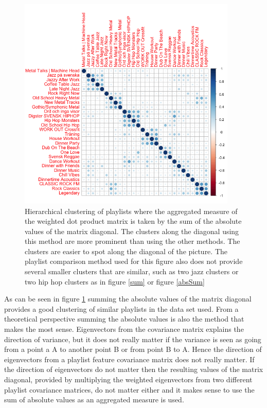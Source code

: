 \documentclass[a4paper,11pt]{kth-mag}
\begin{document}
\begin{figure}
\centering
\includegraphics[width=0.93\textwidth]{images/sumAbs.png}
\caption{Hierarchical clustering of playlists where the aggregated measure of the weighted dot product matrix is taken by the sum of the absolute values of the matrix diagonal. The clusters along the diagonal using this method are more prominent than using the other methods. The clusters are easier to spot along the diagonal of the picture. The playlist comparison method used for this figure also does not provide several smaller clusters that are similar, such as two jazz clusters or two hip hop clusters as in figure \ref{sum} or figure \ref{absSum}}
\label{absSumXXX}
\end{figure}


As can be seen in figure \ref{absSumXXX} summing the absolute values of the matrix diagonal provides a good clustering of similar playlists in the data set used. From a theoretical perspective summing the absolute values is also the method that makes the most sense. Eigenvectors from the covariance matrix explains the direction of variance, but it does not really matter if the variance is seen as going from a point a A to another point B or from point B to A. Hence the direction of eigenvectors from a playlist feature covariance matrix does not really matter. If the direction of eigenvectors do not matter then the resulting values of the matrix diagonal, provided by multiplying the weighted eigenvectors from two different playlist covariance matrices, do not matter either and it makes sense to use the sum of absolute values as an aggregated measure is used.
\end{document}
